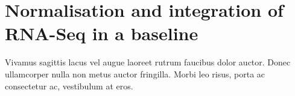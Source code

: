 \chapter{Normalisation and integration of RNA-Seq in a baseline}
\label{ch:baseline}

Vivamus sagittis lacus vel augue laoreet rutrum faucibus dolor auctor. Donec ullamcorper nulla non metus auctor fringilla. Morbi leo risus, porta ac consectetur ac, vestibulum at eros.


